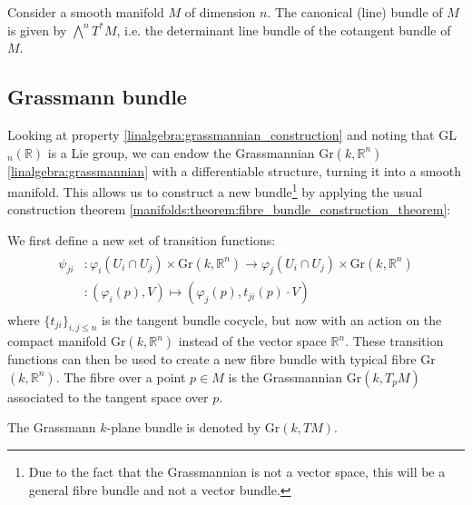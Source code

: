     \begin{example}
        Consider a smooth manifold $M$ of dimension $n$. The canonical (line) bundle of $M$ is given by $\bigwedge^nT^*M$, i.e. the determinant line bundle of the cotangent bundle of $M$.
    \end{example}

\subsection{Grassmann bundle}

    Looking at property \ref{linalgebra:grassmannian_construction} and noting that GL$_n(\mathbb{R})$ is a Lie group, we can endow the Grassmannian Gr$(k, \mathbb{R}^n)$ \ref{linalgebra:grassmannian} with a differentiable structure, turning it into a smooth manifold. This allows us to construct a new bundle\footnote{Due to the fact that the Grassmannian is not a vector space, this will be a general fibre bundle and not a vector bundle.} by applying the usual construction theorem \ref{manifolds:theorem:fibre_bundle_construction_theorem}:

    \begin{construct}\label{manifolds:grassmann_bundle}
        We first define a new set of transition functions:
        \begin{gather}
            \begin{aligned}
                \psi_{ji}&:\varphi_i(U_i\cap U_j)\times \text{Gr}(k, \mathbb{R}^n) \rightarrow \varphi_j(U_i\cap U_j)\times \text{Gr}(k, \mathbb{R}^n)\\
                &:(\varphi_i(p), V)\mapsto(\varphi_j(p), t_{ji}(p)\cdot V)
            \end{aligned}
        \end{gather}
        where $\{t_{ji}\}_{i, j\leq n}$ is the tangent bundle cocycle, but now with an action on the compact manifold Gr$(k, \mathbb{R}^n)$ instead of the vector space $\mathbb{R}^n$. These transition functions can then be used to create a new fibre bundle with typical fibre Gr$(k, \mathbb{R}^n)$. The fibre over a point $p\in M$ is the Grassmannian Gr$(k, T_pM)$ associated to the tangent space over $p$.
    \end{construct}
    \begin{notation}
        The Grassmann $k$-plane bundle is denoted by Gr$(k, TM)$.
    \end{notation}


